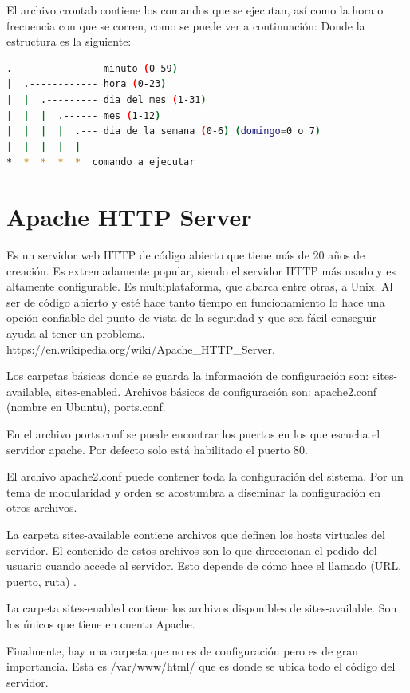 El archivo crontab contiene los comandos que se ejecutan, así como la hora o frecuencia con que se corren, como se puede ver a continuación:
Donde la estructura es la siguiente:

\begin{lstlisting}[language=bash]
.--------------- minuto (0-59) 
|  .------------ hora (0-23)
|  |  .--------- dia del mes (1-31)
|  |  |  .------ mes (1-12) 
|  |  |  |  .--- dia de la semana (0-6) (domingo=0 o 7) 
|  |  |  |  |
*  *  *  *  *  comando a ejecutar
\end{lstlisting}

\section{Apache HTTP Server}

Es un servidor web HTTP de código abierto que tiene más de 20 años de creación. Es extremadamente popular, siendo el servidor HTTP más usado y es altamente configurable.  Es multiplataforma, que abarca entre otras, a Unix. Al ser de código abierto y esté hace tanto tiempo en funcionamiento lo hace una opción confiable del punto de vista de la seguridad y que sea fácil conseguir ayuda al tener un problema. https://en.wikipedia.org/wiki/Apache_HTTP_Server.

Los carpetas básicas donde se guarda la información de configuración son: sites-available, sites-enabled. Archivos básicos de configuración son: apache2.conf (nombre en Ubuntu), ports.conf.

En el archivo ports.conf se puede encontrar los puertos en los que escucha el servidor apache. Por defecto solo está habilitado el puerto 80. 

El archivo apache2.conf puede contener toda la configuración del sistema. Por un tema de modularidad y orden se acostumbra a diseminar la configuración en otros archivos.

La carpeta sites-available contiene archivos que definen los hosts virtuales del servidor. El  contenido de estos archivos son lo que direccionan el pedido del usuario cuando accede al servidor. Esto depende de cómo hace el llamado (URL, puerto, ruta) . 

La carpeta sites-enabled contiene los archivos disponibles de sites-available. Son los únicos que tiene en cuenta Apache.

Finalmente, hay una carpeta que no es de configuración pero es de gran importancia. Esta es /var/www/html/ que es donde se ubica todo el código del servidor.

